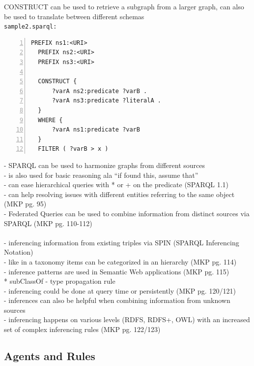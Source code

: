CONSTRUCT can be used to retrieve a subgraph from a larger graph, can also be used to translate between different schemas \\
\texttt{sample2.sparql:}
\begin{lstlisting}[basicstyle=\ttfamily,numbers=left,numberstyle=\footnotesize\ttfamily,backgroundcolor=\color{sourcegray}]
  PREFIX ns1:<URI>
  PREFIX ns2:<URI>
  PREFIX ns3:<URI>

  CONSTRUCT {
      ?varA ns2:predicate ?varB .
      ?varA ns3:predicate ?literalA .
  }
  WHERE {
      ?varA ns1:predicate ?varB
  }
  FILTER ( ?varB > x )
\end{lstlisting}

- SPARQL can be used to harmonize graphs from different sources \\
- is also used for basic reasoning ala ``if found this, assume that'' \\
- can ease hierarchical queries with * or + on the predicate (SPARQL 1.1) \\
- can help resolving issues with different entities referring to the same object (MKP pg. 95)\\
- Federated Queries can be used to combine information from distinct sources via SPARQL (MKP pg. 110-112)\\
\\
- inferencing information from existing triples via SPIN (SPARQL Inferencing Notation) \\
- like in a taxonomy items can be categorized in an hierarchy (MKP pg. 114) \\
- inference patterns are used in Semantic Web applications (MKP pg. 115) \\
   * subClassOf - type propagation rule \\
- inferencing could be done at query time or persistently (MKP pg. 120/121) \\
- inferences can also be helpful when combining information from unknown sources \\
- inferencing happens on various levels (RDFS, RDFS+, OWL) with an increased set of complex inferencing rules (MKP pg. 122/123)
\\

\subsection{Agents and Rules}
\label{sec:semantic_logic_rules}



